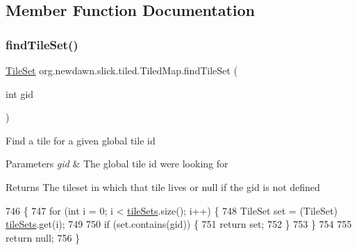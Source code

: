 \subsection{Member Function Documentation}
\mbox{\label{classorg_1_1newdawn_1_1slick_1_1tiled_1_1_tiled_map_a136e9d5ff92016dcfaf8effa027147a2}} 
\subsubsection{\texorpdfstring{find\+Tile\+Set()}{findTileSet()}}
{\footnotesize\ttfamily \mbox{\hyperlink{classorg_1_1newdawn_1_1slick_1_1tiled_1_1_tile_set}{Tile\+Set}} org.\+newdawn.\+slick.\+tiled.\+Tiled\+Map.\+find\+Tile\+Set (\begin{DoxyParamCaption}\item[{int}]{gid }\end{DoxyParamCaption})\hspace{0.3cm}{\ttfamily [inline]}}

Find a tile for a given global tile id


\begin{DoxyParams}{Parameters}
{\em gid} & The global tile id we\textquotesingle{}re looking for \\
\hline
\end{DoxyParams}
\begin{DoxyReturn}{Returns}
The tileset in which that tile lives or null if the gid is not defined 
\end{DoxyReturn}

\begin{DoxyCode}
746                                         \{
747         \textcolor{keywordflow}{for} (\textcolor{keywordtype}{int} i = 0; i < \mbox{\hyperlink{classorg_1_1newdawn_1_1slick_1_1tiled_1_1_tiled_map_a4fd72e23a7aaf6f85905f4bf78e2ce5f}{tileSets}}.size(); i++) \{
748             TileSet \textcolor{keyword}{set} = (TileSet) \mbox{\hyperlink{classorg_1_1newdawn_1_1slick_1_1tiled_1_1_tiled_map_a4fd72e23a7aaf6f85905f4bf78e2ce5f}{tileSets}}.get(i);
749 
750             \textcolor{keywordflow}{if} (\textcolor{keyword}{set}.contains(gid)) \{
751                 \textcolor{keywordflow}{return} \textcolor{keyword}{set};
752             \}
753         \}
754 
755         \textcolor{keywordflow}{return} null;
756     \}
\end{DoxyCode}
\mbox{\label{classorg_1_1newdawn_1_1slick_1_1tiled_1_1_tiled_map_a6370cae21692dded6097e8f877b62cac}} 

